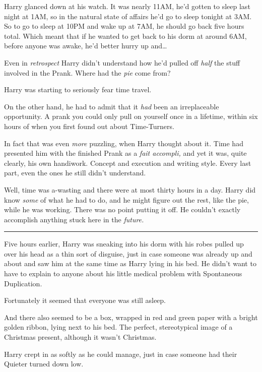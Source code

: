 Harry glanced down at his watch. It was nearly 11AM, he'd gotten to
sleep last night at 1AM, so in the natural state of affairs he'd go to
sleep tonight at 3AM. So to go to sleep at 10PM and wake up at 7AM, he
should go back five hours total. Which meant that if he wanted to get
back to his dorm at around 6AM, before anyone was awake, he'd better
hurry up and\ldots{}

Even in \emph{retrospect} Harry didn't understand how he'd pulled off
\emph{half} the stuff involved in the Prank. Where had the \emph{pie}
come from?

Harry was starting to seriously fear time travel.

On the other hand, he had to admit that it \emph{had} been an
irreplaceable opportunity. A prank you could only pull on yourself once
in a lifetime, within six hours of when you first found out about
Time-Turners.

In fact that was even \emph{more} puzzling, when Harry thought about it.
Time had presented him with the finished Prank as a \emph{fait
accompli,} and yet it was, quite clearly, his own handiwork. Concept and
execution and writing style. Every last part, even the ones he still
didn't understand.

Well, time was a-wasting and there were at most thirty hours in a day.
Harry did know \emph{some} of what he had to do, and he might figure out
the rest, like the pie, while he was working. There was no point putting
it off. He couldn't exactly accomplish anything stuck here in the
\emph{future.}

\begin{center}\rule{3in}{0.4pt}\end{center}

Five hours earlier, Harry was sneaking into his dorm with his robes
pulled up over his head as a thin sort of disguise, just in case someone
was already up and about and saw him at the same time as Harry lying in
his bed. He didn't want to have to explain to anyone about his little
medical problem with Spontaneous Duplication.

Fortunately it seemed that everyone was still asleep.

And there also seemed to be a box, wrapped in red and green paper with a
bright golden ribbon, lying next to his bed. The perfect, stereotypical
image of a Christmas present, although it wasn't Christmas.

Harry crept in as softly as he could manage, just in case someone had
their Quieter turned down low.

